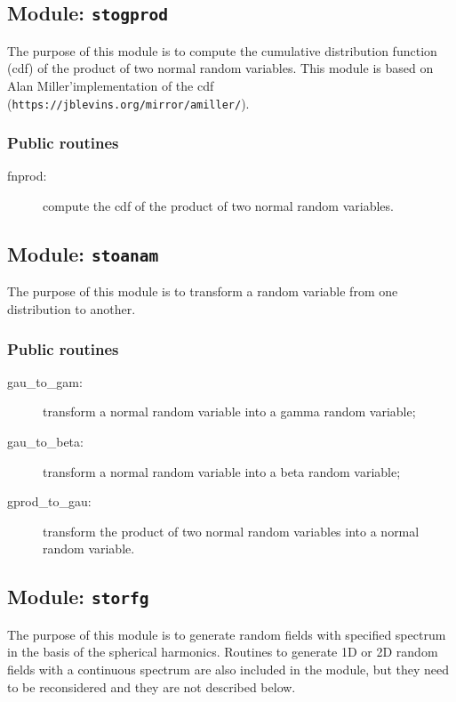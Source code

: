 \documentclass[11pt]{article}
\begin{document}
\subsection{Module: {\tt\bf stogprod}}

The purpose of this module is to compute the cumulative distribution function (cdf)
of the product of two normal random variables.
This module is based on Alan Miller'implementation of the cdf
({\tt https://jblevins.org/mirror/amiller/}).

\subsubsection*{Public routines}

\begin{description}
\item[fnprod:] compute the cdf of the product of two normal random variables.
\end{description}

\subsection{Module: {\tt\bf stoanam}}

The purpose of this module is to transform a random variable
from one distribution to another.

\subsubsection*{Public routines}

\begin{description}
\item[gau\_to\_gam:] transform a normal random variable into a gamma random variable;
\item[gau\_to\_beta:] transform a normal random variable into a beta random variable;
\item[gprod\_to\_gau:] transform the product of two normal random variables
                       into a normal random variable.
\end{description}

\subsection{Module: {\tt\bf storfg}}

The purpose of this module is to generate random fields with specified spectrum
in the basis of the spherical harmonics.
Routines to generate 1D or 2D random fields with a continuous spectrum are also included
in the module, but they need to be reconsidered and they are not described below.
\end{document}
